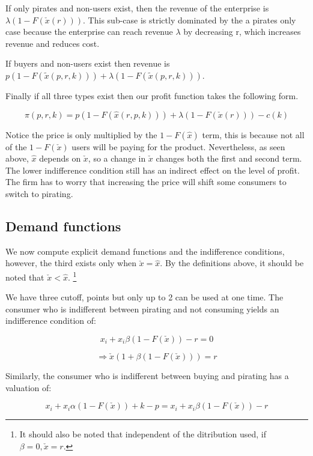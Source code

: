 \documentclass{article}
\begin{document}
If only pirates and non-users exist, then the revenue of the enterprise is $\lambda(1-F(\check{x}(r)))$. This sub-case is strictly dominated by the a pirates only case because the enterprise can reach revenue $\lambda$ by decreasing r, which increases revenue and reduces cost. 

If buyers and non-users exist then revenue is $p(1-F(\tilde{x}(p,r,k)))+\lambda(1-F(\tilde{x}(p,r,k)))$. 

Finally if all three types exist then our profit function takes the following form. 

\begin{equation} \label{eq:profit1}
\pi(p,r,k) 
=p(1-F(\hat{x}(r,p,k))) + \lambda (1-F( \check{x}(r) ))- c(k) 
\end{equation}

Notice the price is only multiplied by the $1 - F(\hat{x})$ term, this is because not all of the $1- F(\check{x})$ users will be paying for the product. Nevertheless, as seen above, $\hat{x}$ depends on $\check{x}$, so a change in $\check{x}$ changes both the first and second term.  The lower indifference condition still has an indirect effect on the level of profit. The firm has to worry that increasing the price will shift some consumers to switch to pirating. 

\subsection{Demand functions}

We now compute explicit demand functions and the indifference conditions, however, the third exists only when $\check{x}=\hat{x}$. By the definitions above, it should be noted that $\check{x}<\hat{x}$. \footnote{It should also be noted that independent of the ditribution used, if $\beta = 0, \check{x}=r$. }

We have three cutoff, points but only up to 2 can be used at one time. The consumer who is indifferent between pirating and not consuming yields an indifference condition of:

\[
x_i + x_i\beta \left(1-F(\check{x})\right) -r = 0 
\]

\begin{equation} \label{eq:indi1}
\Rightarrow \check{x}(1 + \beta(1-F(\check{x}))) = r
\end{equation}

Similarly, the consumer who is indifferent between buying and pirating has a valuation of:

\[
x_i + x_i\alpha \left( 1-F(\check{x}) \right) + k -p = x_i + x_i\beta \left(1-F(\check{x})\right) -r 
\]
\end{document}
